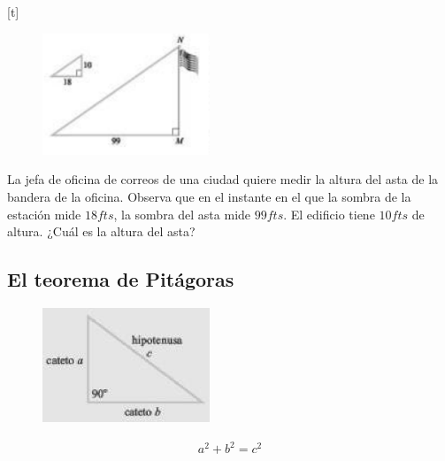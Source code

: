 [t]{}
	\begin{problema}
		\label{exmp:9407}
		\begin{figure}
			\centering
			\includegraphics[width=5cm,keepaspectratio=true]{./trig/trig9448.png}
			\label{fig:9448}
		\end{figure}
		La jefa de oficina de correos de una ciudad quiere medir la altura del asta de la bandera de la oficina. Observa que en el instante en el que la sombra de la estación mide $18fts$, la sombra del asta mide $99fts$. El edificio tiene $10fts$ de altura. ¿Cuál es la altura del asta?
	\end{problema}
	

\subsection{El teorema de Pitágoras}
{}
	\begin{thm}[Pitágoras]
		\begin{figure}
			\centering
			\includegraphics[width=5cm,keepaspectratio=true]{./trig/trig94thm.png}
			\label{fig:94thm}
		\end{figure}
		\begin{align*}
			a^{2}+b^{2}=c^{2}
		\end{align*}
	\end{thm}
	

